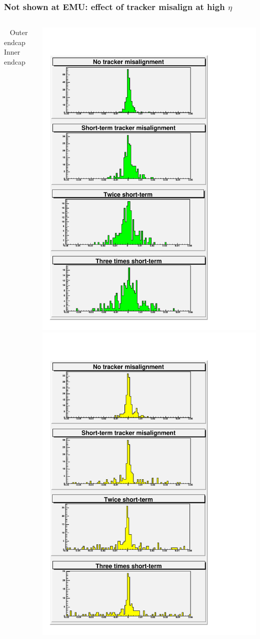 \documentclass[compress]{beamer}
\begin{document}
\begin{frame}
\frametitle{Not shown at EMU: effect of tracker misalign at high $\eta$}
\begin{columns}
\mbox{ } \hfill Outer endcap \hfill \hfill Inner endcap \hfill \mbox{ }

\includegraphics[width=0.5\linewidth]{trackerdep_outer_endcap.pdf}
\includegraphics[width=0.5\linewidth]{trackerdep_inner_endcap.pdf}


\end{columns}
\end{frame}
\end{document}
